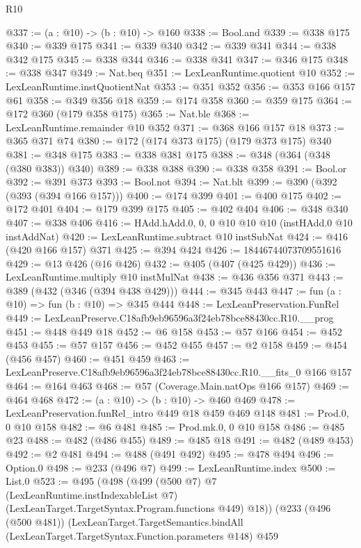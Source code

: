 \begin{lexlean}{R10}
\begin{coremodule}
@337 := (a : @10) -> (b : @10) -> @160
@338 := Bool.and
@339 := @338 @175
@340 := @339 @175
@341 := @339 @340
@342 := @339 @341
@344 := @338 @342 @175
@345 := @338 @344
@346 := @338 @341
@347 := @346 @175
@348 := @338 @347
@349 := Nat.beq
@351 := LexLeanRuntime.quotient @10
@352 := LexLeanRuntime.instQuotientNat
@353 := @351 @352
@356 := @353 @166 @157 @61
@358 := @349 @356 @18
@359 := @174 @358
@360 := @359 @175
@364 := @172 @360 (@179 @358 @175)
@365 := Nat.ble
@368 := LexLeanRuntime.remainder @10 @352
@371 := @368 @166 @157 @18
@373 := @365 @371 @74
@380 := @172 (@174 @373 @175) (@179 @373 @175) @340
@381 := @348 @175
@383 := @338 @381 @175
@388 := @348 (@364 (@348 (@380 @383)) @340)
@389 := @338 @388
@390 := @338 @358
@391 := Bool.or
@392 := @391 @373
@393 := Bool.not
@394 := Nat.blt
@399 := @390 (@392 (@393 (@394 @166 @157)))
@400 := @174 @399
@401 := @400 @175
@402 := @172 @401
@404 := @179 @399 @175
@405 := @402 @404
@406 := @348 @340
@407 := @338 @406
@416 := HAdd.hAdd.{0, 0, 0} @10 @10 @10 (instHAdd.{0} @10 instAddNat)
@420 := LexLeanRuntime.subtract @10 instSubNat
@424 := @416 (@420 @166 @157) @371
@425 := @394 @424
@426 := 18446744073709551616
@429 := @13 @426 (@16 @426)
@432 := @405 (@407 (@425 @429))
@436 := LexLeanRuntime.multiply @10 instMulNat
@438 := @436 @356 @371
@443 := @389 (@432 (@346 (@394 @438 @429)))
@444 := @345 @443
@447 := fun (a : @10) => fun (b : @10) => @345 @444
@448 := LexLeanPreservation.FunRel
@449 := LexLeanPreserve.C18afb9eb96596a3f24eb78bce88430cc.R10.__prog
@451 := @448 @449 @18
@452 := @6 @158
@453 := @57 @166
@454 := @452 @453
@455 := @57 @157
@456 := @452 @455
@457 := @2 @158
@459 := @454 (@456 @457)
@460 := @451 @459
@463 := LexLeanPreserve.C18afb9eb96596a3f24eb78bce88430cc.R10.__fits_0 @166 @157
@464 := @164 @463
@468 := @57 (Coverage.Main.natOps @166 @157)
@469 := @464 @468
@472 := (a : @10) -> (b : @10) -> @460 @469
@478 := LexLeanPreservation.funRel_intro @449 @18 @459 @469 @148
@481 := Prod.{0, 0} @10 @158
@482 := @6 @481
@485 := Prod.mk.{0, 0} @10 @158
@486 := @485 @23
@488 := @482 (@486 @455)
@489 := @485 @18
@491 := @482 (@489 @453)
@492 := @2 @481
@494 := @488 (@491 @492)
@495 := @478 @494
@496 := Option.{0}
@498 := @233 (@496 @7)
@499 := LexLeanRuntime.index
@500 := List.{0}
@523 := @495
    (@498
      (@499
        (@500 @7)
        @7
        (LexLeanRuntime.instIndexableList @7)
        (LexLeanTarget.TargetSyntax.Program.functions @449)
        @18))
    (@233
      (@496 (@500 @481))
      (LexLeanTarget.TargetSemantics.bindAll
        (LexLeanTarget.TargetSyntax.Function.parameters @148)
        @459

\end{coremodule}
\end{lexlean}
